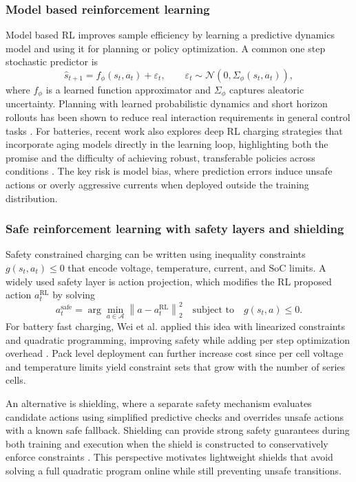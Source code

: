 \documentclass[%
 aip,
 amsmath,amssymb,
reprint, onecolumn %
]{revtex4-1}
\begin{document}
\subsubsection{Model based reinforcement learning}
Model based RL improves sample efficiency by learning a predictive dynamics model and using it for planning or policy optimization. A common one step stochastic predictor is
\begin{equation}
\hat{s}_{t+1}
=
f_{\phi}(s_t,a_t) + \varepsilon_t,
\qquad
\varepsilon_t \sim \mathcal{N}\!\left(0,\Sigma_{\phi}(s_t,a_t)\right),
\label{eq_model_based_dynamics}
\end{equation}
where $f_\phi$ is a learned function approximator and $\Sigma_\phi$ captures aleatoric uncertainty. Planning with learned probabilistic dynamics and short horizon rollouts has been shown to reduce real interaction requirements in general control tasks \cite{chua2018deep}. For batteries, recent work also explores deep RL charging strategies that incorporate aging models directly in the learning loop, highlighting both the promise and the difficulty of achieving robust, transferable policies across conditions \cite{yadu2024personalized}. The key risk is model bias, where prediction errors induce unsafe actions or overly aggressive currents when deployed outside the training distribution.

\subsubsection{Safe reinforcement learning with safety layers and shielding}
Safety constrained charging can be written using inequality constraints $g(s_t,a_t)\le 0$ that encode voltage, temperature, current, and SoC limits. A widely used safety layer is action projection, which modifies the RL proposed action $a_t^{\text{RL}}$ by solving
\begin{equation}
a_t^{\text{safe}}
=
\arg\min_{a \in \mathcal{A}}
\left\|a-a_t^{\text{RL}}\right\|_2^2
\quad
\text{subject to}
\quad
g(s_t,a)\le 0.
\label{eq_safe_projection}
\end{equation}
For battery fast charging, Wei et al. applied this idea with linearized constraints and quadratic programming, improving safety while adding per step optimization overhead \cite{wei2021safe}. Pack level deployment can further increase cost since per cell voltage and temperature limits yield constraint sets that grow with the number of series cells.

An alternative is shielding, where a separate safety mechanism evaluates candidate actions using simplified predictive checks and overrides unsafe actions with a known safe fallback. Shielding can provide strong safety guarantees during both training and execution when the shield is constructed to conservatively enforce constraints \cite{alshiekh2018shielding}. This perspective motivates lightweight shields that avoid solving a full quadratic program online while still preventing unsafe transitions.
\end{document}
